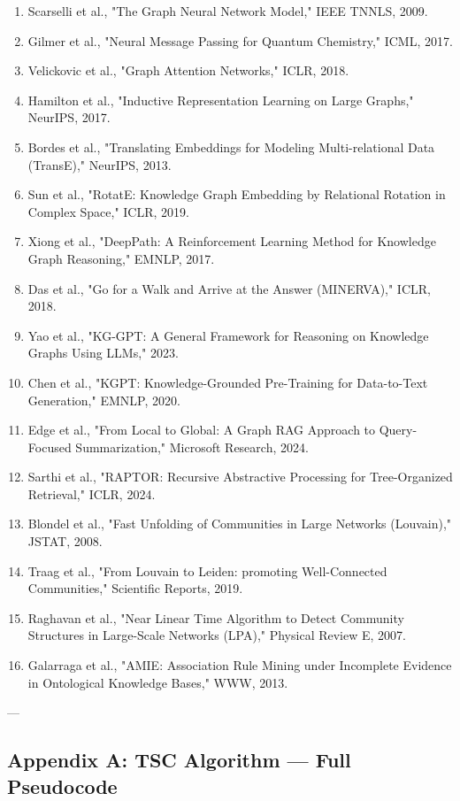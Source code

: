 \documentclass[10pt,journal,compsoc]{IEEEtran}
\begin{document}
\begin{enumerate}
\item Scarselli et al., "The Graph Neural Network Model," IEEE TNNLS, 2009.
\item Gilmer et al., "Neural Message Passing for Quantum Chemistry," ICML, 2017.
\item Velickovic et al., "Graph Attention Networks," ICLR, 2018.
\item Hamilton et al., "Inductive Repres\-entation Learning on Large Graphs," NeurIPS, 2017.
\item Bordes et al., "Translating Embeddings for Modeling Multi-relational Data (TransE)," NeurIPS, 2013.
\item Sun et al., "RotatE: Knowledge Graph Embedding by Relational Rotation in Complex Space," ICLR, 2019.
\item Xiong et al., "DeepPath: A Reinfo\-rcement Learning Method for Knowledge Graph Reasoning," EMNLP, 2017.
\item Das et al., "Go for a Walk and Arrive at the Answer (MINERVA)," ICLR, 2018.
\item Yao et al., "KG-GPT: A General Framework for Reasoning on Knowledge Graphs Using LLMs," 2023.
\item Chen et al., "KGPT: Knowledge-Grounded Pre-Training for Data-to-Text Generation," EMNLP, 2020.
\item Edge et al., "From Local to Global: A Graph RAG Approach to Query-Focused Summar\-ization," Microsoft Research, 2024.
\item Sarthi et al., "RAPTOR: Recursive Abstractive Processing for Tree-Organized Retrieval," ICLR, 2024.
\item Blondel et al., "Fast Unfolding of Communities in Large Networks (Louvain)," JSTAT, 2008.
\item Traag et al., "From Louvain to Leiden: promoting Well-Connected Communities," Scientific Reports, 2019.
\item Raghavan et al., "Near Linear Time Algorithm to Detect Community Structures in Large-Scale Networks (LPA)," Physical Review E, 2007.
\item Galarraga et al., "AMIE: Association Rule Mining under Incomplete Evidence in Ontological Knowledge Bases," WWW, 2013.

\end{enumerate}
---

\subsection{Appendix A: TSC Algorithm — Full Pseudocode}
\end{document}
